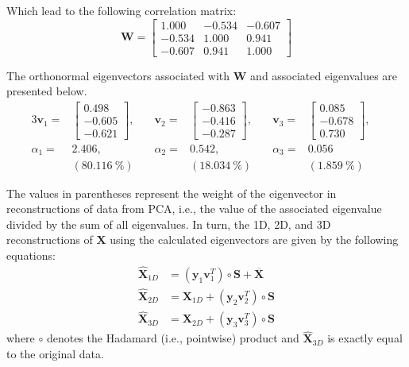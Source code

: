 Which lead to the following correlation matrix:
%
\begin{equation}
    \mathbf{W} = 
    \begin{bmatrix}
         1.000 & -0.534 & -0.607 \\
        -0.534 &  1.000 &  0.941 \\
        -0.607 &  0.941 &  1.000 
    \end{bmatrix}
\end{equation}

The orthonormal eigenvectors associated with $\mathbf{W}$ and associated eigenvalues are presented below.
%
\begin{alignat}{3}
    \mathbf{v}_1 =&
    \begin{bmatrix}
         0.498 \\
        -0.605 \\
        -0.621
    \end{bmatrix}, \quad
    &
    \mathbf{v}_2 =& 
    \begin{bmatrix}
        -0.863 \\
        -0.416 \\
        -0.287
    \end{bmatrix}, \quad
    &
    \mathbf{v}_3 =& 
    \begin{bmatrix}
        0.085 \\
        -0.678 \\
        0.730
    \end{bmatrix}, \quad
    \\
    \alpha_1 =& 2.406, \quad &
    \alpha_2 =& 0.542, \quad &
    \alpha_3 =& 0.056 
    \\
    &(80.116\ \%) & 
    &(18.034\ \%) & 
    &(1.859\ \%) 
\end{alignat}

The values in parentheses represent the weight of the eigenvector 
in reconstructions of data from PCA, i.e., 
the value of the associated eigenvalue divided by the sum of all eigenvalues.
%
In turn, the 1D, 2D, and 3D reconstructions of $\mathbf{X}$ using the calculated eigenvectors 
are given by the following equations:
%
\begin{align}
    \widehat{\mathbf{X}}_{1D} &= (\mathbf{y}_1\mathbf{v}_1^T) \circ \mathbf{S} + \overline{\mathbf{X}} \\
    \widehat{\mathbf{X}}_{2D} &= \mathbf{X}_{1D} + (\mathbf{y}_2\mathbf{v}_2^T) \circ \mathbf{S} \\
    \widehat{\mathbf{X}}_{3D} &= \mathbf{X}_{2D} + (\mathbf{y}_3\mathbf{v}_3^T) \circ \mathbf{S} 
\end{align}
%
where $\circ$ denotes the Hadamard (i.e., pointwise) product and 
$\widehat{\mathbf{X}}_{3D}$ is exactly equal to the original data.

